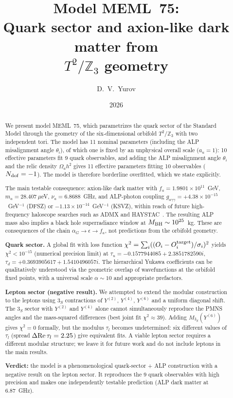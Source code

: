 \documentclass[12pt,a4paper]{article}
\title{\textbf{Model MEML~75:}\\[0.3cm]
\large Quark sector and axion-like dark matter from \\
\(T^2/\mathbb{Z}_3\) geometry}
\author{D.~V.~Yurov}
\date{2026}
\numberwithin{equation}{section}
\begin{document}
\maketitle

\begin{abstract}
\noindent
We present model MEML~75, which parametrizes the quark sector of the Standard Model through the geometry of the six-dimensional orbifold \(T^2/\mathbb{Z}_3\) with two independent tori. The model has 11 nominal parameters (including the ALP misalignment angle \(\theta_i\)), of which one is fixed by an unphysical overall scale (\(a_u = 1\)): 10 effective parameters fit 9 quark observables, and adding the ALP misalignment angle \(\theta_i\) and the relic density \(\Omega_a h^2\) gives 11 effective parameters fitting 10 observables (\(N_{\rm dof} = -1\)). The model is therefore borderline overfitted, which we state explicitly.

The main testable consequence: axion-like dark matter with \(f_a = 1.9801\times 10^{11}\)~GeV, \(m_a = 28.407~\mu\)eV, \(\nu_a = 6.8688\)~GHz, and ALP-photon coupling \(g_{a\gamma\gamma} = +4.38\times 10^{-15}\)~GeV\(^{-1}\) (DFSZ) or \(-1.13\times 10^{-14}\)~GeV\(^{-1}\) (KSVZ), within reach of future high-frequency haloscope searches such as ADMX and HAYSTAC~\cite{ADMX2018,HAYSTAC2021}. The resulting ALP mass also implies a black hole superradiance window at \(M_{\rm BH}\sim 10^{25}\)~kg. These are consequences of the chain \(\alpha_G\to \epsilon \to f_a\), not predictions from the orbifold geometry.

\textbf{Quark sector.} A global fit with loss function \(\chi^2 = \sum_i((O_i - O_i^{\rm target})/\sigma_i)^2\) yields \(\chi^2 < 10^{-15}\) (numerical precision limit) at \(\tau_u = -0.1577944085 + 2.3851782590i\), \(\tau_d = +0.3693905617 + 1.5410496057i\). The hierarchical Yukawa coefficients can be qualitatively understood via the geometric overlap of wavefunctions at the orbifold fixed points, with a universal scale \(\alpha \sim 10\) and appropriate prefactors.

\textbf{Lepton sector (negative result).} We attempted to extend the modular construction to the leptons using \(3_S\) contractions of \(Y^{(2)}\), \(Y^{(4)}\), \(Y^{(6)}\) and a uniform diagonal shift. The \(3_S\) sector with \(Y^{(2)}\) and \(Y^{(4)}\) alone cannot simultaneously reproduce the PMNS angles and the mass-squared differences (best joint fit \(\chi^2\approx 39\)). Adding \(M_{3_S}(Y^{(6)})\) gives \(\chi^2 = 0\) formally, but the modulus \(\tau_l\) becomes undetermined: six different values of \(\tau_l\) (spread \(\Delta{\rm Re}\,\tau_l = 2.25\)) give equivalent fits. A viable lepton sector requires a different modular structure; we leave it for future work and do not include leptons in the main results.

\textbf{Verdict:} the model is a phenomenological quark-sector + ALP construction with a negative result on the lepton sector. It reproduces the 9 quark observables with high precision and makes one independently testable prediction (ALP dark matter at 6.87~GHz).
\end{abstract}
\end{document}
